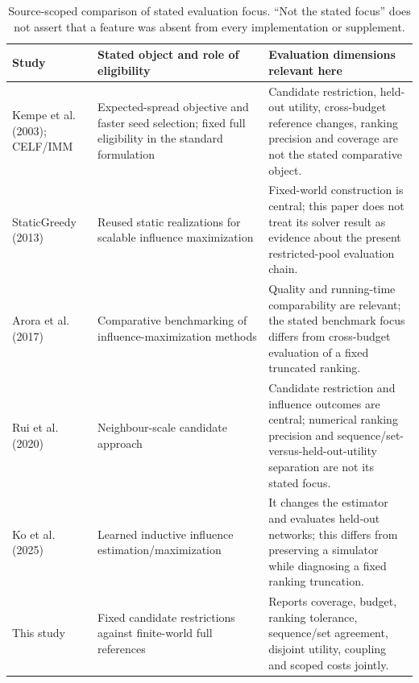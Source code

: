 \begin{table}[htbp]
\caption{Source-scoped comparison of stated evaluation focus. ``Not the stated focus'' does not assert that a feature was absent from every implementation or supplement.}\label{tab:related-scope}
\begin{tabularx}{\linewidth}{p{.19\linewidth}p{.31\linewidth}X}
\toprule
Study & Stated object and role of eligibility & Evaluation dimensions relevant here \\
\midrule
Kempe et al. (2003); CELF/IMM & Expected-spread objective and faster seed selection; fixed full eligibility in the standard formulation & Candidate restriction, held-out utility, cross-budget reference changes, ranking precision and coverage are not the stated comparative object. \\
StaticGreedy (2013) & Reused static realizations for scalable influence maximization & Fixed-world construction is central; this paper does not treat its solver result as evidence about the present restricted-pool evaluation chain. \\
Arora et al. (2017) & Comparative benchmarking of influence-maximization methods & Quality and running-time comparability are relevant; the stated benchmark focus differs from cross-budget evaluation of a fixed truncated ranking. \\
Rui et al. (2020) & Neighbour-scale candidate approach & Candidate restriction and influence outcomes are central; numerical ranking precision and sequence/set-versus-held-out-utility separation are not its stated focus. \\
Ko et al. (2025) & Learned inductive influence estimation/maximization & It changes the estimator and evaluates held-out networks; this differs from preserving a simulator while diagnosing a fixed ranking truncation. \\
This study & Fixed candidate restrictions against finite-world full references & Reports coverage, budget, ranking tolerance, sequence/set agreement, disjoint utility, coupling and scoped costs jointly. \\
\bottomrule
\end{tabularx}
\end{table}
